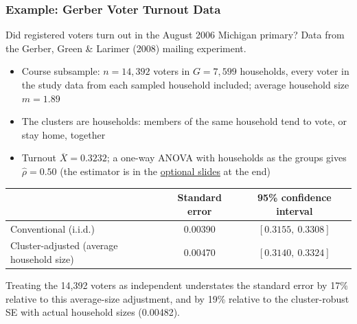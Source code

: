 \documentclass[xcolor=svgnames,9pt,english,aspectratio=169,t]{beamer}
\begin{document}
\begin{frame}
\frametitle{Example: Gerber Voter Turnout Data}
\small
Did registered voters turn out in the August 2006 Michigan primary? Data from the Gerber, Green \& Larimer (2008) mailing experiment.
\begin{itemize}
\addtolength{\itemsep}{.5\baselineskip}
\item Course subsample: $n = 14{,}392$ voters in $G = 7{,}599$ households, every voter in the study data from each sampled household included; average household size $m = 1.89$
\item The clusters are households: members of the same household tend to vote, or stay home, together
\item Turnout $\overline{X} = 0.3232$; a one-way ANOVA with households as the groups gives $\widehat{\rho} = 0.50$ (the estimator is in the \hyperlink{estvar}{optional slides} at the end)
\end{itemize}
\medskip
\begin{center}
\begin{tabular}{l|c|c}
  & Standard error & 95\% confidence interval \\
  \hline
  Conventional (i.i.d.) & 0.00390 & $[0.3155,\ 0.3308]$ \\
  Cluster-adjusted (average household size) & 0.00470 & $[0.3140,\ 0.3324]$ \\
\end{tabular}
\end{center}
\medskip
Treating the 14,392 voters as independent understates the standard error by 17\% relative to this average-size adjustment, and by 19\% relative to the cluster-robust SE with actual household sizes (0.00482).
\end{frame}
\end{document}
